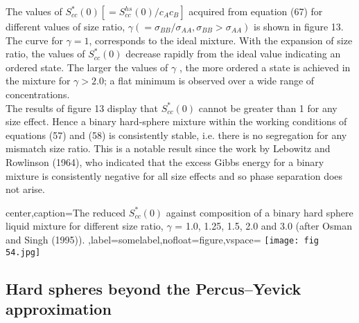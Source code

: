 \documentclass[12pt]{article}
\newcommand*{\1}{\hspace{1pt}}
\begin{document}
    The values of $S^{\ast }_{cc}(0)$$[= S^{hs }_{cc}(0)/c_{A}c_{B}]$ acquired from equation (67)
    for different values
    of size ratio, $ \gamma (= \sigma_{BB}/\sigma_{AA} , \sigma_{BB}> \sigma_{AA})$ is shown in 
    figure 13. The curve for $\gamma = 1$,
    corresponds to the ideal mixture. With the expansion of size ratio, the values of $S^{\ast}_{cc}(0)$ decrease
    rapidly from the ideal value indicating an ordered state. The larger the values of $\gamma$ , the
    more ordered a state is achieved in the mixture for $\gamma > 2.0$; a flat minimum is observed
    over a wide range of concentrations.\\
    The results of figure 13 display that $S^{\ast}_{cc}(0)$ cannot be greater than 1 for any size effect. Hence a binary hard-sphere mixture within the working conditions of equations (57)
    and (58) is consistently stable, i.e. there is no segregation for any mismatch size ratio. This is
    a notable result since the work by Lebowitz and Rowlinson (1964), who indicated that
    the excess Gibbs energy for a binary mixture is consistently negative for all size effects and so
    phase separation does not arise.
    \begin{adjustbox}{center,caption={The reduced $S^{\ast}_{cc}(0)$ against composition of a binary hard sphere liquid mixture for
        different size ratio, $\gamma$ = 1.0, 1.25, 1.5, 2.0 and 3.0 (after Osman and Singh (1995)). },label={somelabel},nofloat=figure,vspace=\bigskipamount}
        \texttt{[image: fig 54.jpg]}
    \end{adjustbox}
    \subsection{ Hard spheres beyond the Percus–Yevick approximation}
\end{document}
